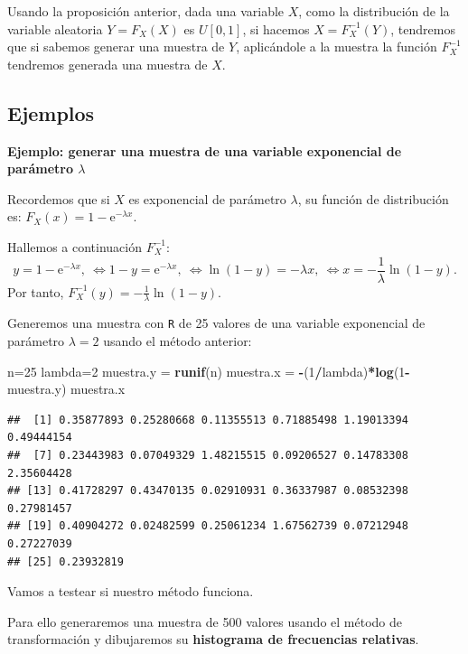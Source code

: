 \documentclass[]{book}
\newenvironment{Shaded}{\begin{snugshade}}{\end{snugshade}}
\newcommand{\DecValTok}[1]{\textcolor[rgb]{0.00,0.00,0.81}{#1}}
\newcommand{\KeywordTok}[1]{\textcolor[rgb]{0.13,0.29,0.53}{\textbf{#1}}}
\newcommand{\NormalTok}[1]{#1}
\newcommand{\OperatorTok}[1]{\textcolor[rgb]{0.81,0.36,0.00}{\textbf{#1}}}
\newcommand{\StringTok}[1]{\textcolor[rgb]{0.31,0.60,0.02}{#1}}
\begin{document}
Usando la proposición anterior, dada una variable \(X\), como la distribución de la variable aleatoria \(Y=F_X(X)\) es \(U[0,1]\), si hacemos \(X=F_X^{-1}(Y)\), tendremos que si sabemos generar una muestra de \(Y\), aplicándole a la muestra la función \(F_X^{-1}\) tendremos generada una muestra de \(X\).

\hypertarget{ejemplos}{%
\subsection{Ejemplos}\label{ejemplos}}

\textbf{Ejemplo: generar una muestra de una variable exponencial de parámetro \(\lambda\)}

Recordemos que si \(X\) es exponencial de parámetro \(\lambda\), su función de distribución es: \(F_X(x)=1-\mathrm{e}^{-\lambda x}\).

Hallemos a continuación \(F_X^{-1}\):
\[
y=1-\mathrm{e}^{-\lambda x},\ \Leftrightarrow 1-y=\mathrm{e}^{-\lambda x},\ \Leftrightarrow \ln(1-y)=-\lambda x,\ \Leftrightarrow x=-\frac{1}{\lambda}\ln(1-y).
\]
Por tanto, \(F_X^{-1}(y)=-\frac{1}{\lambda}\ln(1-y)\).

Generemos una muestra con \texttt{R} de 25 valores de una variable exponencial de parámetro \(\lambda=2\) usando el método anterior:

\begin{Shaded}
\begin{Highlighting}[]
\NormalTok{n=}\DecValTok{25}
\NormalTok{lambda=}\DecValTok{2}
\NormalTok{muestra.y =}\StringTok{ }\KeywordTok{runif}\NormalTok{(n)}
\NormalTok{muestra.x =}\StringTok{ }\OperatorTok{-}\NormalTok{(}\DecValTok{1}\OperatorTok{/}\NormalTok{lambda)}\OperatorTok{*}\KeywordTok{log}\NormalTok{(}\DecValTok{1}\OperatorTok{-}\NormalTok{muestra.y)}
\NormalTok{muestra.x}
\end{Highlighting}
\end{Shaded}

\begin{verbatim}
##  [1] 0.35877893 0.25280668 0.11355513 0.71885498 1.19013394 0.49444154
##  [7] 0.23443983 0.07049329 1.48215515 0.09206527 0.14783308 2.35604428
## [13] 0.41728297 0.43470135 0.02910931 0.36337987 0.08532398 0.27981457
## [19] 0.40904272 0.02482599 0.25061234 1.67562739 0.07212948 0.27227039
## [25] 0.23932819
\end{verbatim}

Vamos a testear si nuestro método funciona.

Para ello generaremos una muestra de 500 valores usando el método de transformación y dibujaremos su \textbf{histograma de frecuencias relativas}.
\end{document}
